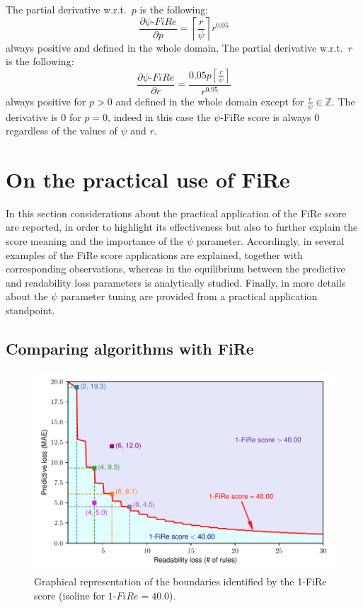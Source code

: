 \documentclass{article}
\newcommand{\fire}{FiRe}
\newcommand{\psifire}{$\psi$-\fire}
\begin{document}
The partial derivative w.r.t.\ $p$ is the following:
%
\begin{equation}
	\frac{\partial \psi\textrm{-}\fire}{\partial p} = \left \lceil{\frac{r}{\psi}}\right \rceil r^{0.05} \label{eq:partialP}
\end{equation}
%
always positive and defined in the whole domain.
%
The partial derivative w.r.t.\ $r$ is the following:
%
\begin{equation}
	\frac{\partial \psi\textrm{-}\fire}{\partial r} = \frac{0.05 p \left \lceil{\frac{r}{\psi}}\right \rceil}{r^{0.95}}\label{eq:partialR}
\end{equation}
%
always positive for $p>0$ and defined in the whole domain except for $\frac{r}{\psi} \in \mathbb{Z}$.
%
The derivative is 0 for $p=0$, indeed in this case the \psifire{} score is always 0 regardless of the values of $\psi$ and $r$.

\section{On the practical use of \fire{}}\label{sec:use}

In this section considerations about the practical application of the \fire{} score are reported, in order to highlight its effectiveness but also to further explain the score meaning and the importance of the $\psi$ parameter.
%
Accordingly, in  several examples of the \fire{} score applications are explained, together with corresponding observations, whereas in  the equilibrium between the predictive and readability loss parameters is analytically studied. Finally, in  more details about the $\psi$ parameter tuning are provided from a practical application standpoint.

\subsection{Comparing algorithms with \fire{}}\label{ssec:comp}

\begin{figure}
	\centering
	\includegraphics[width=\linewidth]{figures/boundaries.pdf}
	\caption{Graphical representation of the boundaries identified by the 1-\fire{} score (isoline for $1\textrm{-}\fire{}=40.0$).}\label{fig:boundaries}
\end{figure}
\end{document}
